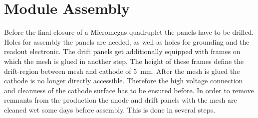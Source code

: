 \documentclass[
twoside,            %
BCOR1.4cm,          %
10pt,               %
headings=normal,    %
headsepline,        %
clearplainpage,		%
final,              %
div=14,
open=right,
bibliography=toc
]{scrreprt}
\begin{document}

\section{Module Assembly}

Before the final closure of a Micromegas quadruplet the panels have to be drilled.
Holes for assembly the panels are needed, as well as holes for grounding and the readout electronic.
The drift panels get additionally equipped with frames on which the mesh is glued in another step.
The height of these frames define the drift-region between mesh and cathode of \SI{5}{mm}.
After the mesh is glued the cathode is no longer directly accessible.
Therefore the high voltage connection and cleanness of the cathode surface has to be ensured before.
In order to remove remnants from the production the anode and drift panels with the mesh are cleaned wet some days before assembly.
This is done in several steps.
\end{document}
